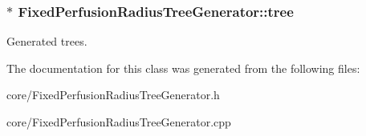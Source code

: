 \subsubsection[{\texorpdfstring{tree}{tree}}]{$\ast$ Fixed\+Perfusion\+Radius\+Tree\+Generator\+::tree\hspace{0.3cm}{\ttfamily [private]}}\hypertarget{class_fixed_perfusion_radius_tree_generator_a79a3059e0c4555a2008829d5a51803dd}{}\label{class_fixed_perfusion_radius_tree_generator_a79a3059e0c4555a2008829d5a51803dd}
Generated trees. 

The documentation for this class was generated from the following files\+:\begin{DoxyCompactItemize}
\item 
core/Fixed\+Perfusion\+Radius\+Tree\+Generator.\+h\item 
core/Fixed\+Perfusion\+Radius\+Tree\+Generator.\+cpp\end{DoxyCompactItemize}
